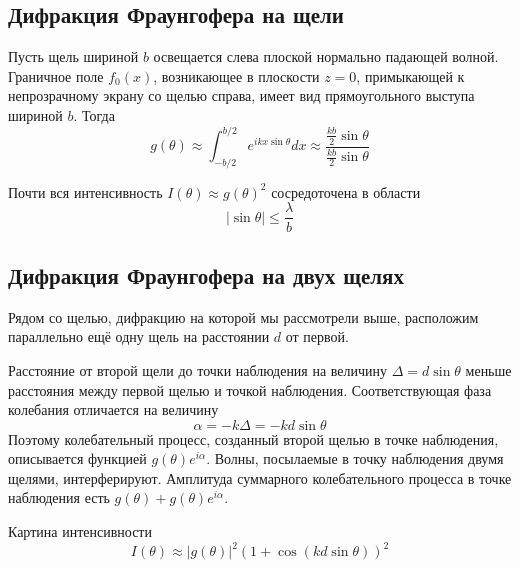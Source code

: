\subsection{Дифракция Фраунгофера на щели}
Пусть щель шириной $b$ освещается слева плоской нормально падающей волной. Граничное поле $f_{0}(x)$, возникающее в плоскости $z = 0$, примыкающей к непрозрачному экрану со щелью справа, имеет вид прямоугольного выступа шириной $b$. Тогда
\[
    g(\theta) \approx \int_{-b/2}^{b/2} e^{ikx\sin \theta}dx \approx \frac{\frac{kb}{2}\sin \theta}{\frac{kb}{2}\sin \theta}
\]
\begin{figure}[ht!]
\end{figure}


Почти вся интенсивность $I(\theta) \approx g(\theta)^{2}$ сосредоточена в области
\[
    \left|\sin \theta \right| \le \frac{ \lambda}{b}
\]

\subsection{Дифракция Фраунгофера на двух щелях}
Рядом со щелью, дифракцию на которой мы рассмотрели выше, расположим параллельно ещё одну щель на расстоянии $d$ от первой.

Расстояние от второй щели до точки наблюдения на величину $ \Delta = d\sin\theta$  меньше расстояния между первой щелью и точкой наблюдения. Соответствующая фаза колебания отличается на величину
\[
    \alpha = -k \Delta = -kd \sin \theta
\]
Поэтому колебательный процесс, созданный второй щелью в точке наблюдения, описывается функцией $g( \theta)e^{i \alpha}$.  Волны, посылаемые в точку наблюдения двумя щелями, интерферируют. Амплитуда суммарного колебательного процесса в точке наблюдения есть $g( \theta) + g( \theta)e^{i \alpha}$.

Картина интенсивности
\[
    I( \theta) \approx \left| g( \theta) \right|^{2} \left(1 + \cos \left(kd \sin \theta\right)\right)^{2}
\]

\begin{figure}[ht!]
\end{figure}

